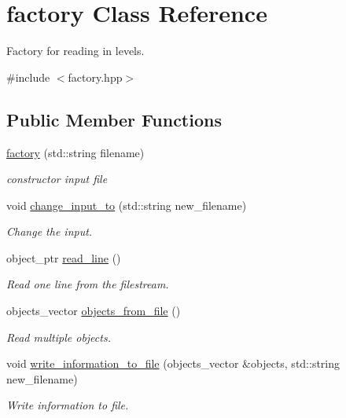 \hypertarget{classfactory}{}\section{factory Class Reference}
\label{classfactory}


Factory for reading in levels.  




{\ttfamily \#include $<$factory.\+hpp$>$}

\subsection*{Public Member Functions}
\begin{DoxyCompactItemize}
\item 
\hyperlink{classfactory_af422815046ef8b9e95a4d8cb747fc43f}{factory} (std\+::string filename)
\begin{DoxyCompactList}\small\item\em constructor input file \end{DoxyCompactList}\item 
void \hyperlink{classfactory_a9e164a8fbb65188de99c39d55d7cc384}{change\+\_\+input\+\_\+to} (std\+::string new\+\_\+filename)
\begin{DoxyCompactList}\small\item\em Change the input. \end{DoxyCompactList}\item 
object\+\_\+ptr \hyperlink{classfactory_a82385866bc910c1b3a3e82d56487dd24}{read\+\_\+line} ()
\begin{DoxyCompactList}\small\item\em Read one line from the filestream. \end{DoxyCompactList}\item 
objects\+\_\+vector \hyperlink{classfactory_afb2fad4ac9b0f39b1bfc3f3fc8d218b6}{objects\+\_\+from\+\_\+file} ()
\begin{DoxyCompactList}\small\item\em Read multiple objects. \end{DoxyCompactList}\item 
void \hyperlink{classfactory_af17f2a44d75cf8ccf712384341c2fcde}{write\+\_\+information\+\_\+to\+\_\+file} (objects\+\_\+vector \&objects, std\+::string new\+\_\+filename)
\begin{DoxyCompactList}\small\item\em Write information to file. \end{DoxyCompactList}\item 

\end{DoxyCompactItemize}
